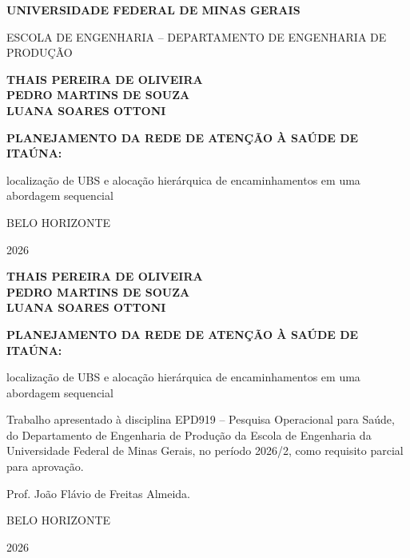 \documentclass[12pt,a4paper,oneside]{report}
\newcommand{\instituicao}{Universidade Federal de Minas Gerais}
\newcommand{\curso}{Escola de Engenharia -- Departamento de Engenharia de Produção}
\newcommand{\autores}{Thais Pereira de Oliveira\\Pedro Martins de Souza\\Luana Soares Ottoni}
\newcommand{\orientador}{Prof. João Flávio de Freitas Almeida}
\newcommand{\cidade}{Belo Horizonte}
\newcommand{\ano}{2026}
\newcommand{\titulo}{Planejamento da rede de atenção à saúde de Itaúna}
\newcommand{\subtitulo}{localização de UBS e alocação hierárquica de encaminhamentos em uma abordagem sequencial}
\begin{document}
\hypersetup{pageanchor=false}

\begin{titlepage}
\centering
{\bfseries\MakeUppercase{\instituicao}\par}
{\MakeUppercase{\curso}\par}
\vspace{2.5cm}
{\bfseries\MakeUppercase{\autores}\par}
\vfill
{\bfseries\large\MakeUppercase{\titulo}:\par}
{\large\subtitulo\par}
\vfill
{\MakeUppercase{\cidade}\par}
{\ano\par}
\end{titlepage}

\begin{titlepage}
\centering
{\bfseries\MakeUppercase{\autores}\par}
\vspace{4cm}
{\bfseries\large\MakeUppercase{\titulo}:\par}
{\large\subtitulo\par}
\vspace{2cm}
\hspace*{.45\linewidth}\begin{minipage}{.55\linewidth}
\singlespacing\small
Trabalho apresentado à disciplina EPD919 -- Pesquisa Operacional para Saúde, do Departamento de
Engenharia de Produção da Escola de Engenharia da \instituicao{}, no período 2026/2, como requisito
parcial para aprovação.\par
\vspace{8pt}
\orientador.
\end{minipage}
\vfill
{\MakeUppercase{\cidade}\par}
{\ano\par}
\end{titlepage}

\hypersetup{pageanchor=true}
\pagestyle{textual}
\end{document}
